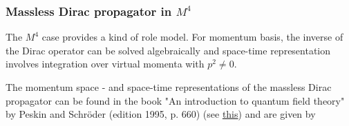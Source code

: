 \documentclass[10pt,epsf]{article}
\begin{document}
\subsubsection{Massless Dirac propagator in $M^4$}

The $M^4$ case  provides a kind of role model.    For momentum basis, the inverse of the Dirac operator  can be solved algebraically and space-time representation involves integration over virtual momenta with $p^2\neq 0$.

The momentum space - and space-time representations of the massless Dirac propagator  can be found in the book "An introduction to quantum field theory"  by Peskin and Schr\"oder  (edition 1995, p. 660) (see \href{https://physics.stackexchange.com/questions/263846/the-analytical-result-for-free-massless-fermion-propagator}{this}) and are given by
\end{document}
